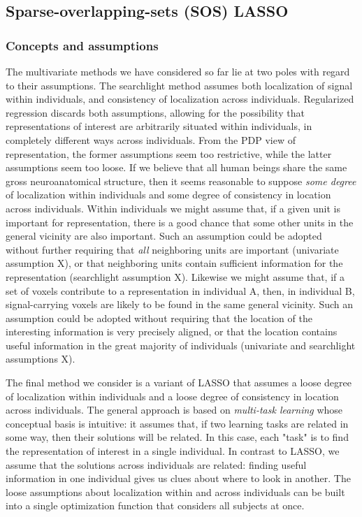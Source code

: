 \subsection{Sparse-overlapping-sets (SOS) LASSO}

\subsubsection{Concepts and assumptions}
The multivariate methods we have considered so far lie at two poles with regard to their assumptions. The searchlight method assumes both localization of signal within individuals, and consistency of localization across individuals. Regularized regression discards both assumptions, allowing for the possibility that representations of interest are arbitrarily situated within individuals, in completely different ways across individuals. From the PDP view of representation, the former assumptions seem too restrictive, while the latter assumptions seem too loose. If we believe that all human beings share the same gross neuroanatomical structure, then it seems reasonable to suppose {\em some degree} of localization within individuals and some degree of consistency in location across individuals. Within individuals we might assume that, if a given unit is important for representation, there is a good chance that some other units in the general vicinity are also important. Such an assumption could be adopted without further requiring that {\em all} neighboring units are important (univariate assumption X), or that neighboring units contain sufficient information for the representation (searchlight assumption X). Likewise we might assume that, if a set of voxels contribute to a representation in individual A, then, in individual B, signal-carrying voxels are likely to be found in the same general vicinity. Such an assumption could be adopted without requiring that the location of the interesting information is very precisely aligned, or that the location contains useful information in the great majority of individuals (univariate and searchlight assumptions X).

The final method we consider is a variant of LASSO that assumes a loose degree of localization within individuals and a loose degree of consistency in location across individuals. The general approach is based on {\em multi-task learning} whose conceptual basis is intuitive: it assumes that, if two learning tasks are related in some way, then their solutions will be related. In this case, each "task" is to find the representation of interest in a single individual. In contrast to LASSO, we assume that the solutions across individuals are related: finding useful information in one individual gives us clues about where to look in another. The loose assumptions about localization within and across individuals can be built into a single optimization function that considers all subjects at once.

